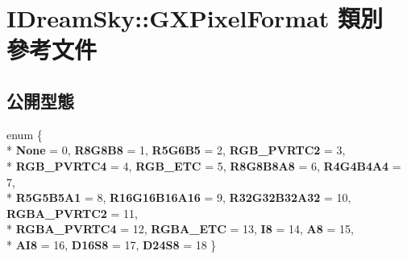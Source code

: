 \hypertarget{class_i_dream_sky_1_1_g_x_pixel_format}{}\section{I\+Dream\+Sky\+:\+:G\+X\+Pixel\+Format 類別 參考文件}
\label{class_i_dream_sky_1_1_g_x_pixel_format}
\subsection*{公開型態}
\begin{DoxyCompactItemize}
\item 
enum \{ \\*
{\bfseries None} = 0, 
{\bfseries R8\+G8\+B8} = 1, 
{\bfseries R5\+G6\+B5} = 2, 
{\bfseries R\+G\+B\+\_\+\+P\+V\+R\+T\+C2} = 3, 
\\*
{\bfseries R\+G\+B\+\_\+\+P\+V\+R\+T\+C4} = 4, 
{\bfseries R\+G\+B\+\_\+\+E\+TC} = 5, 
{\bfseries R8\+G8\+B8\+A8} = 6, 
{\bfseries R4\+G4\+B4\+A4} = 7, 
\\*
{\bfseries R5\+G5\+B5\+A1} = 8, 
{\bfseries R16\+G16\+B16\+A16} = 9, 
{\bfseries R32\+G32\+B32\+A32} = 10, 
{\bfseries R\+G\+B\+A\+\_\+\+P\+V\+R\+T\+C2} = 11, 
\\*
{\bfseries R\+G\+B\+A\+\_\+\+P\+V\+R\+T\+C4} = 12, 
{\bfseries R\+G\+B\+A\+\_\+\+E\+TC} = 13, 
{\bfseries I8} = 14, 
{\bfseries A8} = 15, 
\\*
{\bfseries A\+I8} = 16, 
{\bfseries D16\+S8} = 17, 
{\bfseries D24\+S8} = 18
 \}\hypertarget{class_i_dream_sky_1_1_g_x_pixel_format_ae2696ba76c0724ac6bee8d2afbdc1bb8}{}\label{class_i_dream_sky_1_1_g_x_pixel_format_ae2696ba76c0724ac6bee8d2afbdc1bb8}

\end{DoxyCompactItemize}
